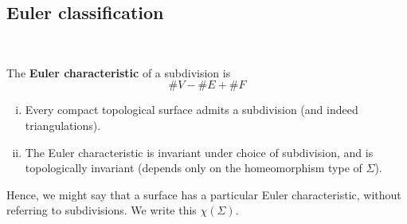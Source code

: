 \documentclass[a4paper,11pt]{article}
\begin{document}
\subsection{Euler classification}\
\vspace*{-1.5em}
\begin{definition}
	The \textbf{Euler characteristic} of a subdivision is
	\[
		\# V - \# E + \# F
	\]
\end{definition}
\begin{theorem}
	\begin{enumerate}[(i)]
		\item Every compact topological surface admits a subdivision (and indeed triangulations).
		\item The Euler characteristic is invariant under choice of subdivision, and is topologically invariant (depends only on the homeomorphism type of $\Sigma$). 
	\end{enumerate}
	Hence, we might say that a surface has a particular Euler characteristic, without referring to subdivisions.
	We write this \( \chi(\Sigma) \).
\end{theorem}
\end{document}
